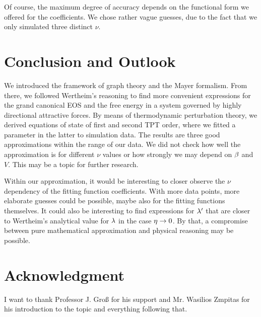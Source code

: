 \documentclass[8.5pt,twoside,twocolumn]{article}
\theoremstyle{standard}
\begin{document}
Of course, the maximum degree of accuracy depends on the functional form we offered for the
coefficients. We chose rather vague guesses, due to the fact that we only simulated three
distinct $\nu$.

\section{Conclusion and Outlook}
\label{Con}
We introduced the framework of graph theory and the Mayer formalism. From there, we
followed Wertheim's reasoning to find more convenient expressions for the grand
canonical EOS and the free energy in a system governed by highly directional
attractive forces. By means of thermodynamic perturbation theory, we derived equations
of state of first and second TPT order, where we fitted a parameter in the latter
to simulation data. The results are three good approximations within the range of
our data. We did not check how well the approximation is for different $\nu$ values
or how strongly we may depend on $\beta$ and $V$. This may be a topic for further
research.

Within our approximation, it would be interesting to closer observe the $\nu$ dependency
of the fitting function coefficients. With more data points, more elaborate guesses
could be possible, maybe also for the fitting functions themselves. It could also
be interesting to find expressions for $\lambda'$ that are closer to Wertheim's
analytical value for $\lambda$ in the case \mbox{$\eta \rightarrow 0$}. By that, a compromise
between pure mathematical approximation and physical reasoning may be possible.

\section*{Acknowledgment}
I want to thank Professor J. Groß for his support and Mr. Wasilios Zmpitas for
his introduction to the topic and everything following that.   


% 


\end{document}

